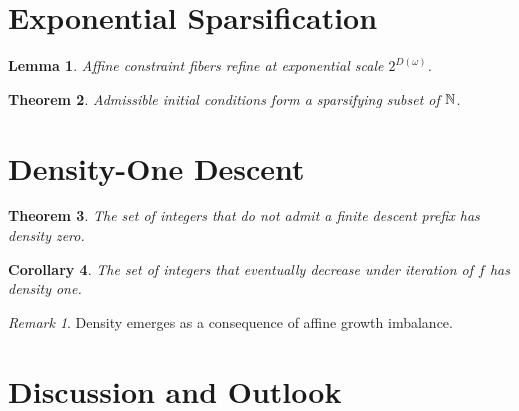 \documentclass[12pt, oneside]{article}
\numberwithin{equation}{section}
\theoremstyle{definition}
\theoremstyle{plain}
\newtheorem{theorem}{Theorem}[section]
\newtheorem{lemma}[theorem]{Lemma}
\newtheorem{corollary}[theorem]{Corollary}
\theoremstyle{remark}
\newtheorem*{remark}{Remark}
\begin{document}
\section{Exponential Sparsification}

\begin{lemma}
Affine constraint fibers refine at exponential scale $2^{D(\omega)}$.
\end{lemma}

\begin{theorem}
Admissible initial conditions form a sparsifying subset of $\mathbb{N}$.
\end{theorem}

\section{Density-One Descent}

\begin{theorem}
The set of integers that do not admit a finite descent prefix has density zero.
\end{theorem}

\begin{corollary}
The set of integers that eventually decrease under iteration of $f$ has density one.
\end{corollary}

\begin{remark}
Density emerges as a consequence of affine growth imbalance.
\end{remark}

\section{Discussion and Outlook}


\clearpage


\end{document}
